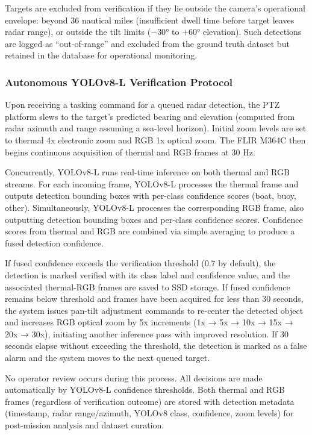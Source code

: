 \documentclass[twocolumn, 10pt]{article}
\begin{document}
Targets are excluded from verification if they lie outside the camera's operational envelope: beyond 36 nautical miles (insufficient dwell time before target leaves radar range), or outside the tilt limits ($-30°$ to $+60°$ elevation). Such detections are logged as ``out-of-range'' and excluded from the ground truth dataset but retained in the database for operational monitoring.

\subsubsection{Autonomous YOLOv8-L Verification Protocol}

Upon receiving a tasking command for a queued radar detection, the PTZ platform slews to the target's predicted bearing and elevation (computed from radar azimuth and range assuming a sea-level horizon). Initial zoom levels are set to thermal 4x electronic zoom and RGB 1x optical zoom. The FLIR M364C then begins continuous acquisition of thermal and RGB frames at 30 Hz.

Concurrently, YOLOv8-L runs real-time inference on both thermal and RGB streams. For each incoming frame, YOLOv8-L processes the thermal frame and outputs detection bounding boxes with per-class confidence scores (boat, buoy, other). Simultaneously, YOLOv8-L processes the corresponding RGB frame, also outputting detection bounding boxes and per-class confidence scores. Confidence scores from thermal and RGB are combined via simple averaging to produce a fused detection confidence.

If fused confidence exceeds the verification threshold (0.7 by default), the detection is marked verified with its class label and confidence value, and the associated thermal-RGB frames are saved to SSD storage. If fused confidence remains below threshold and frames have been acquired for less than 30 seconds, the system issues pan-tilt adjustment commands to re-center the detected object and increases RGB optical zoom by 5x increments (1x → 5x → 10x → 15x → 20x → 30x), initiating another inference pass with improved resolution. If 30 seconds elapse without exceeding the threshold, the detection is marked as a false alarm and the system moves to the next queued target.

No operator review occurs during this process. All decisions are made automatically by YOLOv8-L confidence thresholds. Both thermal and RGB frames (regardless of verification outcome) are stored with detection metadata (timestamp, radar range/azimuth, YOLOv8 class, confidence, zoom levels) for post-mission analysis and dataset curation.
\end{document}

